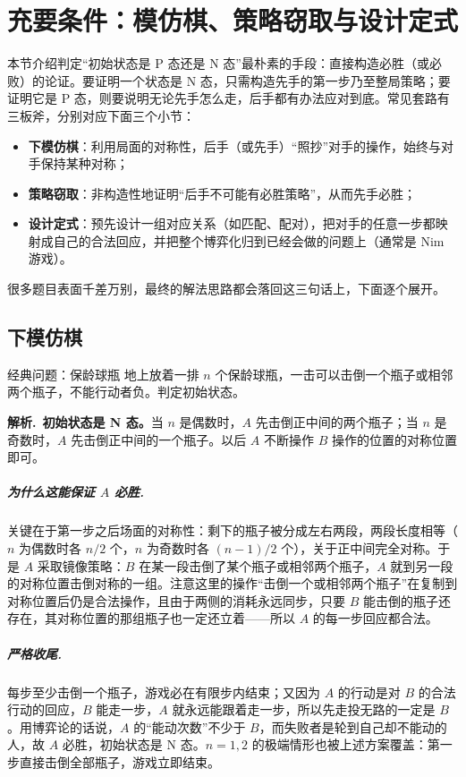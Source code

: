 \documentclass[UTF8,a4paper,11pt,oneside,openany,fontset=fandol]{ctexbook}
\theoremstyle{definition}
\newcommand{\sol}{\par\noindent\textbf{解析.}\ }
\begin{document}
\chapter{充要条件：模仿棋、策略窃取与设计定式}
本节介绍判定“初始状态是 P 态还是 N 态”最朴素的手段：直接构造必胜（或必败）的论证。要证明一个状态是 N 态，只需构造先手的第一步乃至整局策略；要证明它是 P 态，则要说明无论先手怎么走，后手都有办法应对到底。常见套路有三板斧，分别对应下面三个小节：
\begin{itemize}
\item \textbf{下模仿棋}：利用局面的对称性，后手（或先手）“照抄”对手的操作，始终与对手保持某种对称；
\item \textbf{策略窃取}：非构造性地证明“后手不可能有必胜策略”，从而先手必胜；
\item \textbf{设计定式}：预先设计一组对应关系（如匹配、配对），把对手的任意一步都映射成自己的合法回应，并把整个博弈化归到已经会做的问题上（通常是 Nim 游戏）。
\end{itemize}
很多题目表面千差万别，最终的解法思路都会落回这三句话上，下面逐个展开。

\section{下模仿棋}
\begin{problem}{经典问题：保龄球瓶}
地上放着一排 $n$ 个保龄球瓶，一击可以击倒一个瓶子或相邻两个瓶子，不能行动者负。判定初始状态。
\end{problem}

\sol \textbf{初始状态是 N 态。}当 $n$ 是偶数时，$A$ 先击倒正中间的两个瓶子；当 $n$ 是奇数时，$A$ 先击倒正中间的一个瓶子。以后 $A$ 不断操作 $B$ 操作的位置的对称位置即可。

\paragraph{为什么这能保证 $A$ 必胜.} 关键在于第一步之后场面的对称性：剩下的瓶子被分成左右两段，两段长度相等（$n$ 为偶数时各 $n/2$ 个，$n$ 为奇数时各 $(n-1)/2$ 个），关于正中间完全对称。于是 $A$ 采取镜像策略：$B$ 在某一段击倒了某个瓶子或相邻两个瓶子，$A$ 就到另一段的对称位置击倒对称的一组。注意这里的操作“击倒一个或相邻两个瓶子”在复制到对称位置后仍是合法操作，且由于两侧的消耗永远同步，只要 $B$ 能击倒的瓶子还存在，其对称位置的那组瓶子也一定还立着——所以 $A$ 的每一步回应都合法。

\paragraph{严格收尾.} 每步至少击倒一个瓶子，游戏必在有限步内结束；又因为 $A$ 的行动是对 $B$ 的合法行动的回应，$B$ 能走一步，$A$ 就永远能跟着走一步，所以先走投无路的一定是 $B$。用博弈论的话说，$A$ 的“能动次数”不少于 $B$，而失败者是轮到自己却不能动的人，故 $A$ 必胜，初始状态是 N 态。$n=1,2$ 的极端情形也被上述方案覆盖：第一步直接击倒全部瓶子，游戏立即结束。
\end{document}
